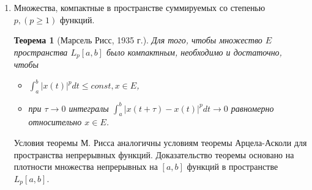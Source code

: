 \documentclass[12pt,a4paper,titlepage, oneside]{book}
\newcommand{\overbar}[1]{\mkern 1.5mu\overline{\mkern-1.5mu#1\mkern-1.5mu}\mkern 1.5mu}
\theoremstyle{definition}
\theoremstyle{plain}
\newtheorem*{theorem}{Теорема}
\theoremstyle{remark}
\theoremstyle{remark}
\theoremstyle{remark}
\theoremstyle{remark}
\theoremstyle{plain}
\theoremstyle{plain}
\begin{document}
\begin{enumerate}
\begin{proof}
	Множество $H_{\varepsilon}$ компактно в $C[a, b]$. Действительно, каждая ломаная определяется $n$ числами $(\eta_1, \eta_2,...,\eta_n )$, где все числа $\eta_k$ ограничены: $|\eta_k|\leq const$. Из любой последовательности ломаных из $H_{\varepsilon}$ можно образовать фундаментальную последовательность.
	
	Покажем, что компактное множество $H_{\varepsilon}$ образует в $E$ $\varepsilon$-сеть. Для любой функции $x\in E$ построим ломаную $\overbar{x}(t)$, $\overbar{x} \in H_{\varepsilon}$. Так как $x(t)$ непрерывна, то на отрезке $[t_k, t_{k+1}]$ она достигает своего максимального значения $M_k$ и своего минимального значения $m_k$: $m_k \leq x(t) \leq M_k, t \in [t_k, t_{k+1}]$. В этих же пределах лежат и значения линейной функции $\overbar{x}(t)$. Ясно, что $|x(t)-\overbar{x}(t)|\leq M_k-m_k, t \in [t_k, t_{k+1}]$.
	
	В силу выбора значения $\delta$ величины $M_k-m_k < \varepsilon$. Тогда и $\rho(x, \overbar{x} < \varepsilon$. Согласна следствию теоремы Хаусдорфа, множество $E$ компактно в $C[a, b]$.
	
	$\underbar {Необходимость}$ Свойства функций из компактного множества $E$, указанные в теореме, сразу следуют из существования в $E$ $\underbar {конечной}$ $\varepsilon$-сети непрерывных на $[a, b]$ функций $x_1(t), x_2(t),...,x_N(t)$.	

\end{proof}

	\item Множества, компактные в пространстве суммируемых со степенью $p, (p \geq 1)$ функций.

\begin{theorem} [Марсель Рисс, 1935 г.]
Для того, чтобы множество $E$  пространства $L_p[a, b]$ было компактным, необходимо и достаточно, чтобы

\begin{itemize}

	\item $\int_{a}^{b} |x(t)|^p dt \leq const, x \in E$,

	\item при $\tau \to 0$ интегралы $\int_{a}^{b} |x(t+\tau)-x(t)|^p dt \to 0$ равномерно относительно $x \in E$.

\end{itemize}

\end{theorem}

Условия теоремы М. Рисса аналогичны условиям теоремы Арцела-Асколи для пространства непрерывных функций. Доказательство теоремы основано на плотности множества непрерывных на $[a, b]$ функций в пространстве $L_p [a, b]$.


\end{enumerate}
\end{document}
